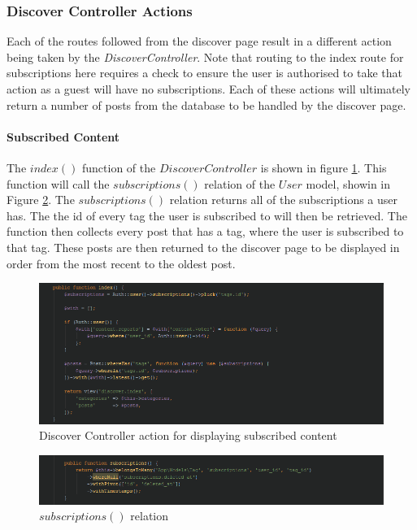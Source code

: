 \subsubsection{Discover Controller Actions}
Each of the routes followed from the discover page result in a different action being taken by the \textit{DiscoverController}. Note that routing to the index route for subscriptions here requires a check to ensure the user is authorised to take that action as a guest will have no subscriptions. Each of these actions will ultimately return a number of posts from the database to be handled by the discover page.

\paragraph{Subscribed Content}
The $index()$ function of the $Discover  Controller$ is shown in figure \ref{fig:DiscoverControllerSubscribed}. This function will call the $subscriptions()$ relation of the $User$ model, showin in Figure \ref{fig:SubscribedPosts}. The $subscriptions()$ relation returns all of the subscriptions a user has. The the id of every tag the user is subscribed to will then be retrieved. The function then collects every post that has a tag, where the user is subscribed to that tag. These posts are then returned to the discover page to be displayed in order from the most recent to the oldest post.

\begin{figure}[H]
\centering
\includegraphics[width=\textwidth]{Images/Implementation/DiscoverControllerSubscribed}
\caption{Discover Controller action for displaying subscribed content}
\label{fig:DiscoverControllerSubscribed}
\end{figure}

\begin{figure}[H]
\centering
\includegraphics[width=\textwidth]{Images/Implementation/SubscribedPosts}
\caption{$subscriptions()$ relation}
\label{fig:SubscribedPosts}
\end{figure}


